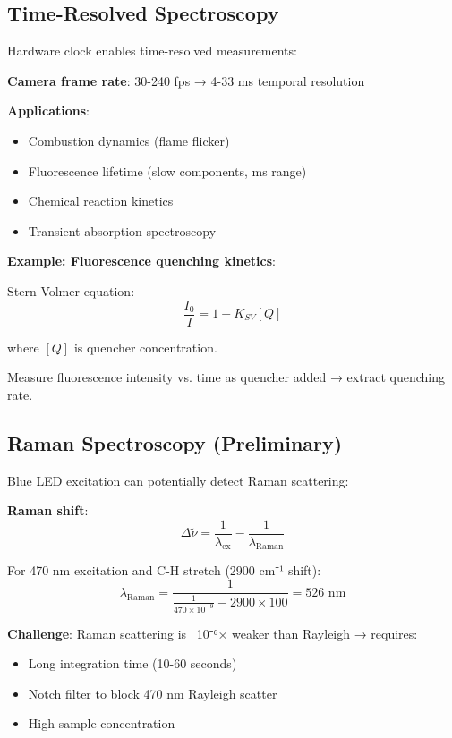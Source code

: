 \documentclass[12pt,a4paper]{article}
\begin{document}
\subsection{Time-Resolved Spectroscopy}

Hardware clock enables time-resolved measurements:

\textbf{Camera frame rate}: 30-240 fps → 4-33 ms temporal resolution

\textbf{Applications}:
\begin{itemize}
\item Combustion dynamics (flame flicker)
\item Fluorescence lifetime (slow components, ms range)
\item Chemical reaction kinetics
\item Transient absorption spectroscopy
\end{itemize}

\textbf{Example: Fluorescence quenching kinetics}:

Stern-Volmer equation:
\begin{equation}
\frac{I_0}{I} = 1 + K_{SV}[Q]
\end{equation}

where $[Q]$ is quencher concentration.

Measure fluorescence intensity vs. time as quencher added → extract quenching rate.

\subsection{Raman Spectroscopy (Preliminary)}

Blue LED excitation can potentially detect Raman scattering:

\textbf{Raman shift}:
\begin{equation}
\Delta \tilde{\nu} = \frac{1}{\lambda_{\text{ex}}} - \frac{1}{\lambda_{\text{Raman}}}
\end{equation}

For 470 nm excitation and C-H stretch (2900 cm⁻¹ shift):
\begin{equation}
\lambda_{\text{Raman}} = \frac{1}{\frac{1}{470 \times 10^{-9}} - 2900 \times 100} = 526 \text{ nm}
\end{equation}

\textbf{Challenge}: Raman scattering is ~10⁻⁶× weaker than Rayleigh → requires:
\begin{itemize}
\item Long integration time (10-60 seconds)
\item Notch filter to block 470 nm Rayleigh scatter
\item High sample concentration
\end{itemize}
\end{document}
